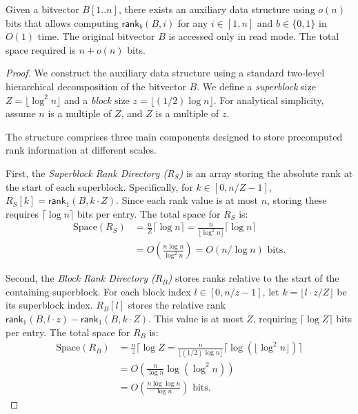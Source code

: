 \begin{theorem} \label{th:rank}
    Given a bitvector $B[1..n]$, there exists an auxiliary data structure using $o(n)$ bits that allows computing $\textsf{rank}_b(B, i)$ for any $i \in [1,n]$ and $b \in \{0,1\}$ in $O(1)$ time. The original bitvector $B$ is accessed only in read mode. The total space required is $n + o(n)$ bits.
\end{theorem}
\begin{proof}
    We construct the auxiliary data structure using a standard two-level hierarchical decomposition of the bitvector $B$. We define a \emph{superblock} size $Z = \lfloor \log^2 n \rfloor$ and a \emph{block} size $z = \lfloor (1/2) \log n \rfloor$. For analytical simplicity, assume $n$ is a multiple of $Z$, and $Z$ is a multiple of $z$.

    The structure comprises three main components designed to store precomputed rank information at different scales.

    First, the \emph{Superblock Rank Directory ($R_S$)} is an array storing the absolute rank at the start of each superblock. Specifically, for $k \in [0, n/Z - 1]$, $R_S[k] = \textsf{rank}_1(B, k \cdot Z)$. Since each rank value is at most $n$, storing these requires $\lceil \log n \rceil$ bits per entry. The total space for $R_S$ is:
    \begin{align*}
        \text{Space}(R_S) & = \frac{n}{Z} \lceil \log n \rceil = \frac{n}{\lfloor \log^2 n \rfloor} \lceil \log n \rceil \\
                          & = O\left(\frac{n \log n}{\log^2 n}\right) = O(n / \log n) \text{ bits}.
    \end{align*}

    Second, the \emph{Block Rank Directory ($R_B$)} stores ranks relative to the start of the containing superblock. For each block index $l \in [0, n/z - 1]$, let $k = \lfloor l \cdot z / Z \rfloor$ be its superblock index. $R_B[l]$ stores the relative rank $\textsf{rank}_1(B, l \cdot z) - \textsf{rank}_1(B, k \cdot Z)$. This value is at most $Z$, requiring $\lceil \log Z \rceil$ bits per entry. The total space for $R_B$ is:
    \begin{align*}
        \text{Space}(R_B) & = \frac{n}{z} \lceil \log Z = \frac{n}{\lfloor (1/2) \log n \rfloor} \lceil \log(\lfloor \log^2 n \rfloor) \rceil \\
                          & = O\left(\frac{n}{\log n} \log(\log^2 n)\right)                                                                   \\
                          & = O\left(\frac{n \log \log n}{\log n}\right) \text{ bits}.
    \end{align*}


\end{proof}
